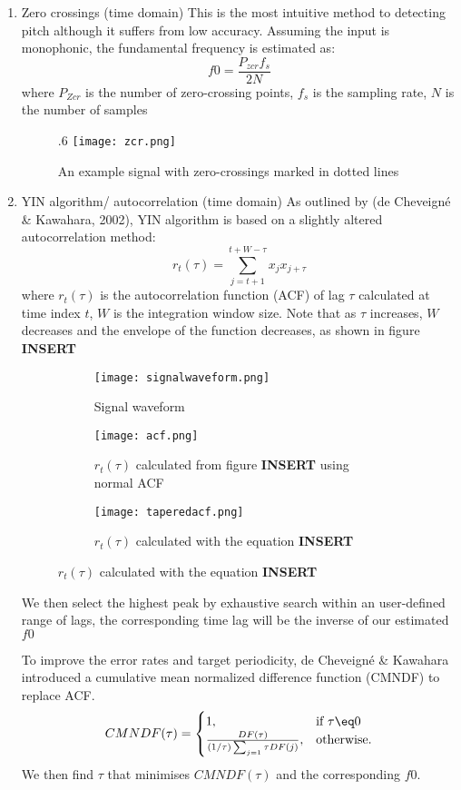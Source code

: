 \begin{enumerate}
	\item Zero crossings (time domain)
	This is the most intuitive method to detecting pitch although it suffers from low accuracy.
	Assuming the input is monophonic, the fundamental frequency is estimated as:
	\[f0 = \frac{P_{zcr}f_s}{2N}\]
	where $P_{Zcr}$ is the number of zero-crossing points, $f_s$ is the sampling rate,
	$N$ is the number of samples
	\begin{figure}{.6\textwidth}
		\texttt{[image: zcr.png]}
		\caption{An example signal with zero-crossings marked in dotted lines \cite{zcr}}
	\end{figure}
	
	\item YIN algorithm/ autocorrelation (time domain)
	As outlined by (de Cheveigné & Kawahara, 2002), YIN algorithm is based on a slightly altered autocorrelation method:
	\[r_t(\tau)=\sum_{j=t+1}^{t+W-\tau}x_j x_{j+\tau}\]
	where $r_t(\tau)$ is the autocorrelation function (ACF) of lag $\tau$ calculated at time index $t$, $W$ is the integration
	window size. Note that as $\tau$ increases, $W$ decreases and the envelope of the function decreases, as shown in figure 
	\textbf{INSERT}

	\begin{figure}
		\centering
		\begin{subfigure}{.3\textwidth}
		  \centering
		  \texttt{[image: signalwaveform.png]}
		  \caption{Signal waveform}
		  \label{signal}
		\end{subfigure}%
		\begin{subfigure}{.3\textwidth}
			\centering
			\texttt{[image: acf.png]}
			\caption{$r_t(\tau)$ calculated from figure \textbf{INSERT} using normal ACF}
			\label{acf}
		  \end{subfigure}%
		\begin{subfigure}{.3\textwidth}
		  \centering
		  \texttt{[image: taperedacf.png]}
		  \caption{$r_t(\tau)$ calculated with the equation \textbf{INSERT}}
		  \label{taped}
		\end{subfigure}%
		\label{fig}
	\end{figure}
	
	We then select the highest peak by exhaustive search within an user-defined range of lags, the corresponding time lag will be
	the inverse of our estimated $f0$

	To improve the error rates and target periodicity, de Cheveigné & Kawahara introduced a cumulative mean normalized difference function (CMNDF)
	to replace ACF. 
	\[CMNDF(\tau) =  
	\begin{cases}
		1,              & \text{if } \tau \eq 0\\ 
    	\frac{DF(\tau)}{(1/\tau)\sum_{j=1}{\tau}DF(j)}, & \text{otherwise.} \\
	\end{cases}
	\]
	We then find $\tau$ that minimises $CMNDF(\tau)$ and the corresponding $f0$.


\end{enumerate}
